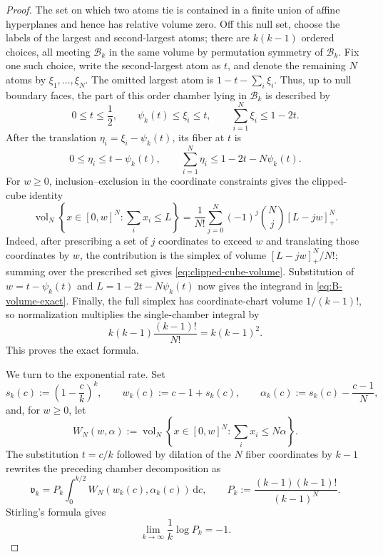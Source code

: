 \documentclass[11pt]{article}
\theoremstyle{definition}
\theoremstyle{remark}
\newcommand{\body}{\mathcal{B}}
\begin{document}
\begin{proof}
The set on which two atoms tie is contained in a finite union of affine
hyperplanes and hence has relative volume zero.  Off this null set, choose
the labels of the largest and second-largest atoms; there are $k(k-1)$
ordered choices, all meeting $\body_k$ in the same volume by permutation
symmetry of $\body_k$.  Fix one such choice, write the
second-largest atom as $t$, and denote the remaining $N$ atoms by
$\xi_1,\ldots,\xi_N$.  The omitted largest atom is
$1-t-\sum_i\xi_i$.  Thus, up to null boundary faces, the part of this
order chamber lying in $\body_k$ is described by
\[
 0\le t\le\frac12,\qquad
 \psi_k(t)\le\xi_i\le t,\qquad
 \sum_{i=1}^N\xi_i\le1-2t.
\]
After the translation $\eta_i=\xi_i-\psi_k(t)$, its fiber at $t$ is
\[
 0\le\eta_i\le t-\psi_k(t),\qquad
 \sum_{i=1}^N\eta_i\le1-2t-N\psi_k(t).
\]
For $w\ge0$, inclusion--exclusion in the coordinate constraints gives the
clipped-cube identity
\begin{equation}\label{eq:clipped-cube-volume}
 \operatorname{vol}_N\left\{x\in[0,w]^N:\sum_i x_i\le L\right\}
 =\frac1{N!}\sum_{j=0}^N(-1)^j\binom Nj[L-jw]_+^N.
\end{equation}
Indeed, after prescribing a set of $j$ coordinates to exceed $w$ and
translating those coordinates by $w$, the contribution is the simplex of
volume $[L-jw]_+^N/N!$; summing over the prescribed set gives
\eqref{eq:clipped-cube-volume}.  Substitution of
$w=t-\psi_k(t)$ and $L=1-2t-N\psi_k(t)$ now gives the integrand in
\eqref{eq:B-volume-exact}.  Finally, the full simplex has coordinate-chart
volume $1/(k-1)!$, so normalization multiplies the single-chamber integral
by
\[
 k(k-1)\frac{(k-1)!}{N!}=k(k-1)^2.
\]
This proves the exact formula.

We turn to the exponential rate.  Set
\[
 s_k(c):=\left(1-\frac ck\right)^k,\qquad
 w_k(c):=c-1+s_k(c),\qquad
 \alpha_k(c):=s_k(c)-\frac{c-1}{N},
\]
and, for $w\ge0$, let
\[
 W_N(w,\alpha):=
 \operatorname{vol}_N\left\{x\in[0,w]^N:\sum_i x_i\le N\alpha\right\}.
\]
The substitution $t=c/k$ followed by dilation of the $N$ fiber coordinates
by $k-1$ rewrites the preceding chamber decomposition as
\begin{equation}\label{eq:B-volume-scaled}
 \mathfrak v_k=P_k\int_0^{k/2}W_N(w_k(c),\alpha_k(c))\,\mathrm d c,
 \qquad
 P_k:=\frac{(k-1)(k-1)!}{(k-1)^N}.
\end{equation}
Stirling's formula gives
\begin{equation}\label{eq:B-volume-prefactor}
 \lim_{k\to\infty}\frac1k\log P_k=-1.
\end{equation}


\end{proof}
\end{document}
